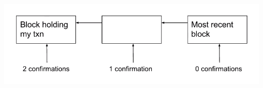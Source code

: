 \documentclass[full.tex]{subfiles}
\begin{document}
  \includegraphics[scale=0.5]{confirmations}
  
  
\end{document}
